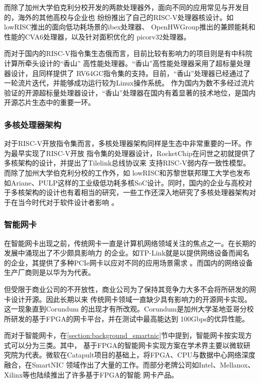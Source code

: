 而除了加州大学伯克利分校开发的两款处理器外，面向不同的应用常见与开发目的，海外的其他高校与企业也
纷纷推出了自己的RISC-V处理器核设计。如lowRISC推出的面向低功耗场景的ibex处理器\cite{lowrisc_ibex}、
OpenHWGroup推出的兼顾能耗和性能的CVA6处理器\cite{zaruba2019cost}，以及针对面积优化的
picorv32处理器\cite{picorv32}。

而对于国内的RISC-V指令集生态俄而言，目前比较有影响力的项目则是有中科院计算所牵头设计的“香山”
高性能处理器\cite{xiangshan_riscv}。“香山”高性能处理器采用了超标量处理器设计，且同样提供了
RV64GC指令集的支持。目前，“香山”处理器已经通过了一轮流片迭代，并能够成功运行较为Linux操作系统。
作为国内为数不多经过流片验证的开源超标量处理器设计，“香山”处理器在国内有着显著的技术地位，是国内
开源芯片生态中的重要一环。

\subsubsection{多核处理器架构}

对于RISC-V开放指令集而言，多核处理器架构同样是生态中非常重要的一环。作为最早实现了RISC-V开放
指令集的处理器设计，RocketChip在问世之初就提供了多核架构的设计，并提出了Tilelink总线协议来
支持RISC-V弱内存一致性模型\cite{asanovic2016rocket}。而除了加州大学伯克利分校的工作外，如
lowRISC和苏黎世联邦理工大学也发布如Ariane、PULP这样的工业级低功耗多核SoC设计\cite{balkind2019openpiton+,
rossi2017energy}。同时，国内的企业与高校对于多核架构的设计也有着相当的研究\cite{manycore2013fudan,
gs464e2015recent}，一些工作还深入地研究了多核处理器架构对于在当今时代对于软件设计者影响
\cite{manycoretime2016recent}。

\subsubsection{智能网卡}

在智能网卡出现之前，传统网卡一直是计算机网络领域关注的焦点之一。在长期的发展中涌现出了不少颇具影响力
的企业。如TP-Link就是以提供网络设备而闻名的企业，其提供了多种PCIe网卡以应对不同的应用场景需求
\cite{tplink_website}。而国内的网络设备生产厂商则是以华为为代表\cite{huawei_website}。

但受限于商业公司的不开放性，商业公司为了保持其竞争力大多不会将所研发的网卡设计开源。因此长期以来
传统网卡领域一直缺少具有影响力的开源网卡实现。这一现象直到Corundum\cite{forencich2020corundum}
的出现才有所改观。Corundum是加州大学圣地亚哥分校所研发的基于FPGA的网卡平台，并在测试中最高能达到
100Gbps的优异性能。

而对于智能网卡，在\ref{section:background_smartnic}节中提到，智能网卡按实现方式可以分为三类。其中，
基于FPGA的智能网卡实现方案在学术界主要以微软研究院为代表\cite{firestone2018azure,fowers2015scalable,
caulfield2016cloud}。微软在Catapult项目的基础上，将FPGA、CPU与数据中心网络深度融合，在SmartNIC
领域作出了大量的工作。而部分老牌公司如Intel、Mellanox、Xilinx等也陆续推出了许多基于FPGA的智能
网卡产品\cite{mellanox2020whitepaper,intel2020pac,intel2019d5005,xilinx2020alveou25,
xilinx2020x2}。

